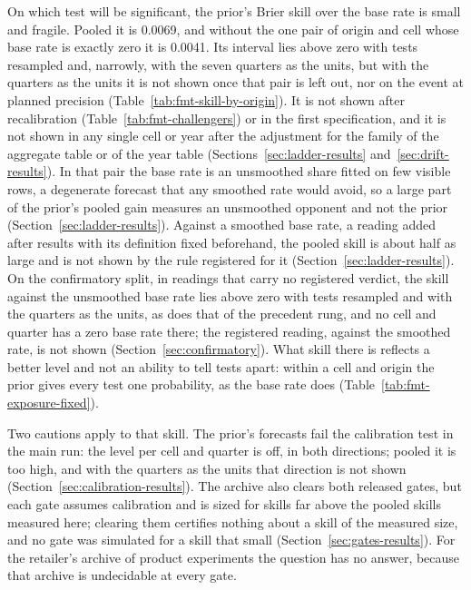 On which test will be significant, the prior's Brier skill over the base rate is small and fragile. Pooled it is 0.0069, and without the one pair of origin and cell whose base rate is exactly zero it is 0.0041. Its interval lies above zero with tests resampled and, narrowly, with the seven quarters as the units, but with the quarters as the units it is not shown once that pair is left out, nor on the event at planned precision (Table~\ref{tab:fmt-skill-by-origin}). It is not shown after recalibration (Table~\ref{tab:fmt-challengers}) or in the first specification, and it is not shown in any single cell or year after the adjustment for the family of the aggregate table or of the year table (Sections~\ref{sec:ladder-results} and~\ref{sec:drift-results}). In that pair the base rate is an unsmoothed share fitted on few visible rows, a degenerate forecast that any smoothed rate would avoid, so a large part of the prior's pooled gain measures an unsmoothed opponent and not the prior (Section~\ref{sec:ladder-results}). Against a smoothed base rate, a reading added after results with its definition fixed beforehand, the pooled skill is about half as large and is not shown by the rule registered for it (Section~\ref{sec:ladder-results}). On the confirmatory split, in readings that carry no registered verdict, the skill against the unsmoothed base rate lies above zero with tests resampled and with the quarters as the units, as does that of the precedent rung, and no cell and quarter has a zero base rate there; the registered reading, against the smoothed rate, is not shown (Section~\ref{sec:confirmatory}). What skill there is reflects a better level and not an ability to tell tests apart: within a cell and origin the prior gives every test one probability, as the base rate does (Table~\ref{tab:fmt-exposure-fixed}).

Two cautions apply to that skill. The prior's forecasts fail the calibration test in the main run: the level per cell and quarter is off, in both directions; pooled it is too high, and with the quarters as the units that direction is not shown (Section~\ref{sec:calibration-results}). The archive also clears both released gates, but each gate assumes calibration and is sized for skills far above the pooled skills measured here; clearing them certifies nothing about a skill of the measured size, and no gate was simulated for a skill that small (Section~\ref{sec:gates-results}). For the retailer's archive of product experiments the question has no answer, because that archive is undecidable at every gate.

